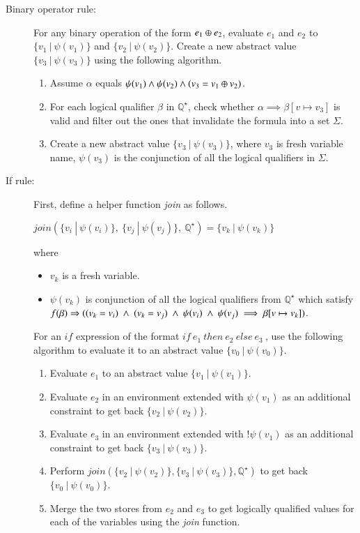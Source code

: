 \documentclass[9pt]{article}
\newcommand{\constr}{\ensuremath{\psi}}
\newcommand{\marketplace}{\ensuremath{\mathbb{Q}^{\star}}}
\begin{document}
\begin{description}
\item[Binary operator rule:]
For any binary operation of the form \ensuremath{e_1 \bop e_2}, evaluate $e_1$ and $e_2$ to $\{v_1\ |\ \constr(v_1)\}$ and $\{v_2\ |\ \constr(v_2)\}$. Create a new abstract value $\{v_3\ |\ \constr(v_3)\}$ using the following algorithm.
\begin{enumerate}
\item
Assume $\alpha$ equals $\constr(v_1) \logand \constr(v_2) \logand (v_3 = v_1 \bop v_2)$.
\item
For each logical qualifier \ensuremath{\beta} in \marketplace, check whether \ensuremath{\alpha \implies \beta[v\mapsto v_3]} is valid and filter out the ones that invalidate the formula into a set $\Sigma$.
\item
Create a new abstract value $\{v_3\ |\ \constr(v_3)\}$, where $v_3$ is fresh variable name, $\constr(v_3)$ is the conjunction of all the logical qualifiers in $\Sigma$.
\end{enumerate}


\item[If rule:] First, define a helper function \textit{join} as follows. 

\begin{center}$join(\{v_i\ |\ \constr(v_i)\},\ \{v_j\ |\ \constr(v_j)\},\ \marketplace) = \{v_k\ |\ \constr(v_k)\}$\end{center}
where 
\begin{itemize}
\item
$v_k$ is a fresh variable.
\item
$\constr(v_k)$ is conjunction of all the logical qualifiers from $\marketplace$ which satisfy $f(\beta) \Rightarrow ((v_k = v_i)\ \logand\ (v_k = v_j)\ \logand\ \constr(v_i)\ \logand\ \constr(v_j)\implies \beta[v\mapsto v_k])$.
\end{itemize}
For an $if$ expression of the format $if\ e_1\ then\ e_2\ else\ e_3\ $, use the following algorithm to evaluate it to an abstract value $\{v_0\ |\ \constr(v_0)\}$.
\begin{enumerate}
\item
Evaluate $e_1$ to an abstract value $\{v_1\ |\ \constr(v_1)\}$. 
\item
Evaluate $e_2$ in an environment extended with $\constr(v_1)$ as an additional constraint to get back $\{v_2\ |\ \constr(v_2)\}$.
\item
Evaluate $e_3$ in an environment extended with $!\constr(v_1)$ as an additional constraint to get back $\{v_3\ |\ \constr(v_3)\}$.
\item
Perform $join(\{v_2\ |\ \constr(v_2)\}, \{v_3\ |\ \constr(v_3)\}, \marketplace)$ to get back $\{v_0\ |\ \constr(v_0)\}$.
\item
Merge the two stores from $e_2$ and $e_3$ to get logically qualified values for each of the variables using the \textit{join} function.
\end{enumerate}
\end{description}
\end{document}
